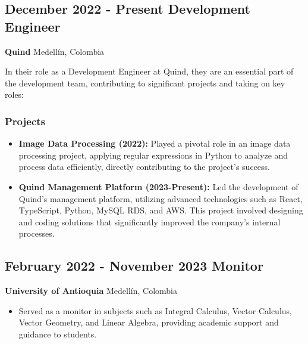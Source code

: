 \subsection*{December 2022 - Present \hfill \textbf{Development Engineer}}
\textbf{Quind} \hfill Medellín, Colombia

In their role as a Development Engineer at Quind, they are an essential part of the development team, contributing to significant projects and taking on key roles:

\subsubsection*{Projects}

\begin{itemize}
    \item \textbf{Image Data Processing (2022):} Played a pivotal role in an image data processing project, applying regular expressions in Python to analyze and process data efficiently, directly contributing to the project's success.
    \item \textbf{Quind Management Platform (2023-Present):} Led the development of Quind's management platform, utilizing advanced technologies such as React, TypeScript, Python, MySQL RDS, and AWS. This project involved designing and coding solutions that significantly improved the company's internal processes.
\end{itemize}

\vspace{5pt}

\subsection*{February 2022 - November 2023 \hfill \textbf{Monitor}}
\textbf{University of Antioquia} \hfill Medellín, Colombia

\begin{itemize}
\item Served as a monitor in subjects such as Integral Calculus, Vector Calculus, Vector Geometry, and Linear Algebra, providing academic support and guidance to students.
\end{itemize}
